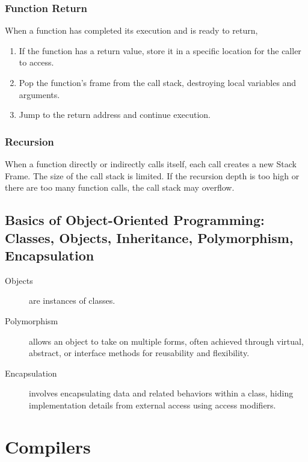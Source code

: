 \documentclass[11pt,journal,compsoc]{IEEEtran}
\begin{document}
\subsubsection{Function Return}

When a function has completed its execution and is ready to return,

\begin{enumerate}
    \item If the function has a return value, store it in a specific location for the caller to access.
    \item Pop the function's frame from the call stack, destroying local variables and arguments.
    \item Jump to the return address and continue execution.
\end{enumerate}


\subsubsection{Recursion}

When a function directly or indirectly calls itself, each call creates a new Stack Frame. The size of the call stack is limited. If the recursion depth is too high or there are too many function calls, the call stack may overflow.


\subsection{Basics of Object-Oriented Programming: Classes, Objects, Inheritance, Polymorphism, Encapsulation}

\begin{description}
    \item[Objects] are instances of classes.
    
    \item[Polymorphism] allows an object to take on multiple forms, often achieved through virtual, abstract, or interface methods for reusability and flexibility.
    
    \item[Encapsulation] involves encapsulating data and related behaviors within a class, hiding implementation details from external access using access modifiers.
\end{description}


\section{Compilers}
\end{document}
